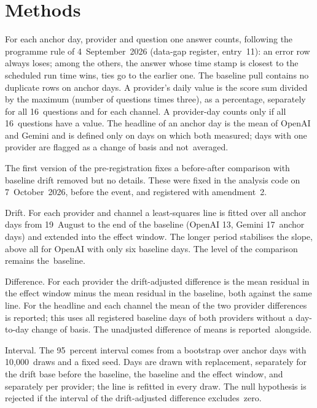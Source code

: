 \documentclass[11pt]{article}
\begin{document}
\section{Methods}

For each anchor day, provider and question one answer counts, following the programme rule of 4~September~2026 (data-gap register, entry~11): an error row always loses; among the others, the answer whose time stamp is closest to the scheduled run time wins, ties go to the earlier one. The baseline pull contains no duplicate rows on anchor days. A provider's daily value is the score sum divided by the maximum (number of questions times three), as a percentage, separately for all 16~questions and for each channel. A provider-day counts only if all 16~questions have a value. The headline of an anchor day is the mean of OpenAI and Gemini and is defined only on days on which both measured; days with one provider are flagged as a change of basis and not~\mbox{averaged.}

The first version of the pre-registration fixes a before-after comparison with baseline drift removed but no details. These were fixed in the analysis code on 7~October~2026, before the event, and registered with amendment~2.

Drift. For each provider and channel a least-squares line is fitted over all anchor days from 19~August to the end of the baseline (OpenAI 13, Gemini 17~anchor days) and extended into the effect window. The longer period stabilises the slope, above all for OpenAI with only six baseline days. The level of the comparison remains the~\mbox{baseline.}

Difference. For each provider the drift-adjusted difference is the mean residual in the effect window minus the mean residual in the baseline, both against the same line. For the headline and each channel the mean of the two provider differences is reported; this uses all registered baseline days of both providers without a day-to-day change of basis. The unadjusted difference of means is reported~\mbox{alongside.}

Interval. The 95~percent interval comes from a bootstrap over anchor days with 10,000~draws and a fixed seed. Days are drawn with replacement, separately for the drift base before the baseline, the baseline and the effect window, and separately per provider; the line is refitted in every draw. The null hypothesis is rejected if the interval of the drift-adjusted difference excludes~\mbox{zero.}
\end{document}
